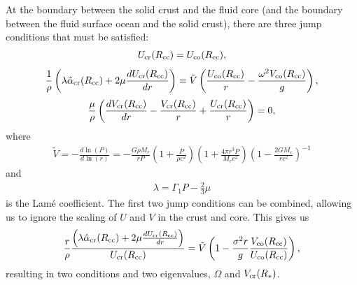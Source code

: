 \documentclass[fleqn,usenatbib]{mnras}
\begin{document}
\hspace{\parindent}At the boundary between the solid crust and the fluid core (and the boundary between the fluid surface ocean and the solid crust), there are three jump conditions that must be satisfied:
\begin{align}
U_{\rm cr}(R_{\rm cc})=U_{\rm co}(R_{\rm cc}),
\label{eq:jump1}
\end{align}
\begin{align}
\frac{1}{\rho}\left(\lambda\hat{\alpha}_{\rm cr}(R_{\rm cc})+2\mu\frac{dU_{\rm cr}(R_{\rm cc})}{dr}\right)=\tilde{V}\left(\frac{U_{\rm co}(R_{\rm cc})}{r}-\frac{\omega^2V_{\rm co}(R_{\rm cc})}{g}\right),
\label{eq:jump2}
\end{align}
\begin{align}
\frac{\mu}{\rho}\left(\frac{dV_{\rm cr}(R_{\rm cc})}{dr}-\frac{V_{\rm cr}(R_{\rm cc})}{r}+\frac{U_{\rm cr}(R_{\rm cc})}{r}\right)=0,
\label{eq:jump3}
\end{align}
\noindent where 
\begin{align}
\tilde{V}=-\frac{d\ln\left(P\right)}{d\ln\left(r\right)}=-\frac{G\rho M_r}{rP}\left(1+\frac{P}{\rho c^2}\right)\left(1+\frac{4\pi r^3 P}{M_r c^2}\right)\left(1-\frac{2GM_r}{rc^2}\right)^{-1}
\end{align}
\noindent and
\begin{align}
\lambda=\Gamma_1P-\frac{2}{3}\mu
\end{align}
\noindent is the Lam\'e coefficient. The first two jump conditions can be combined, allowing us to ignore the scaling of $U$ and $V$ in the crust and core. This gives us %
\begin{align}
\frac{r}{\rho}\frac{\left(\lambda\hat{\alpha}_{\rm cr}(R_{\rm cc})+2\mu\frac{dU_{\rm cr}(R_{\rm cc})}{dr}\right)}{U_{\rm cr}(R_{\rm cc})}=\tilde{V}\left(1-\frac{\sigma^2r}{g}\frac{V_{\rm co}(R_{\rm cc})}{U_{\rm co}(R_{\rm cc})}\right),
\end{align}
\noindent resulting in two conditions and two eigenvalues, $\Omega$ and $V_{\rm cr}(R_*)$.
\end{document}
